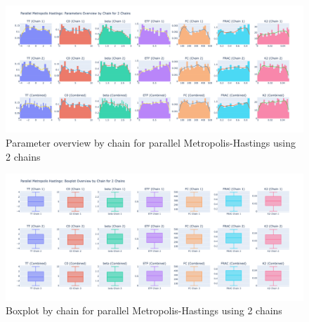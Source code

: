 \begin{figure}[H]
    \centering
    \includegraphics[width=.6\textwidth]{figures/parallel_mh/param_overview_2.png}
    \captionsetup{width=.8\textwidth}
    \caption{Parameter overview by chain for parallel Metropolis-Hastings using 2 chains}
    \label{fig:enter-label}
\end{figure}

\begin{figure}[H]
    \centering
    \includegraphics[width=.6\textwidth]{figures/parallel_mh/boxplot_2.png}
    \captionsetup{width=.8\textwidth}
    \caption{Boxplot by chain for parallel Metropolis-Hastings using 2 chains}
    \label{fig:enter-label}
\end{figure}